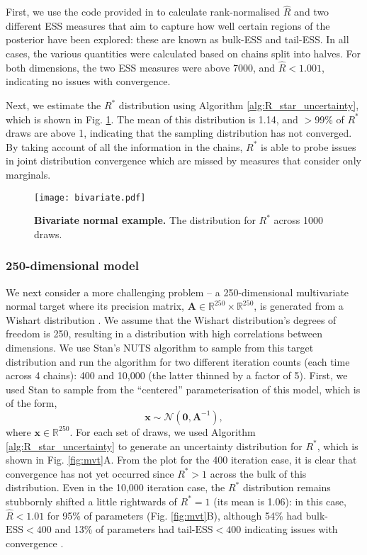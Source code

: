 \documentclass{article}
\begin{document}
First, we use the code provided in \cite{vehtari2019rank} to calculate rank-normalised $\widehat{R}$ and two different ESS measures that aim to capture how well certain regions of the posterior have been explored: these are known as bulk-ESS and tail-ESS. In all cases, the various quantities were calculated based on chains split into halves. For both dimensions, the two ESS measures were above 7000, and $\widehat{R}<1.001$, indicating no issues with convergence.

Next, we estimate the $R^*$ distribution using Algorithm \ref{alg:R_star_uncertainty}, which is shown in Fig. \ref{fig:bivariate}. The mean of this distribution is 1.14, and $>$99\% of $R^*$ draws are above 1, indicating that the sampling distribution has not converged. By taking account of all the information in the chains, $R^*$ is able to probe issues in joint distribution convergence which are missed by measures that consider only marginals.

\begin{figure}[!htb]
	\centerline{\texttt{[image: bivariate.pdf]}}
	\caption{\textbf{Bivariate normal example.} The distribution for $R^*$ across 1000 draws.}
	\label{fig:bivariate}
\end{figure}

\subsubsection{250-dimensional model}\label{sec:multivariate_normal_250}
We next consider a more challenging problem -- a 250-dimensional multivariate normal target where its precision matrix, $\boldsymbol{A}\in\mathbb{R}^{250}\times\mathbb{R}^{250}$, is generated from a Wishart distribution \citep{hoffman2014no}. We assume that the Wishart distribution's degrees of freedom is 250, resulting in a distribution with high correlations between dimensions. We use Stan's NUTS algorithm to sample from this target distribution and run the algorithm for two different iteration counts (each time across 4 chains): 400 and 10,000 (the latter thinned by a factor of 5). First, we used Stan to sample from the ``centered'' parameterisation of this model, which is of the form,
%
\begin{equation}\label{eq:mvt_normal_250}
\boldsymbol{x}\sim \mathcal{N}(\boldsymbol{0},\boldsymbol{A}^{-1}),
\end{equation}
%
where $\boldsymbol{x}\in\mathbb{R}^{250}$. For each set of draws, we used Algorithm \ref{alg:R_star_uncertainty} to generate an uncertainty distribution for $R^*$, which is shown in Fig. \ref{fig:mvt}A. From the plot for the 400 iteration case, it is clear that convergence has not yet occurred since $R^*>1$ across the bulk of this distribution. Even in the 10,000 iteration case, the $R^*$ distribution remains stubbornly shifted a little rightwards of $R^*=1$ (its mean is 1.06): in this case, $\widehat{R}<1.01$ for 95\% of parameters (Fig. \ref{fig:mvt}B), although 54\% had bulk-$\text{ESS}<400$ and 13\% of parameters had tail-$\text{ESS}<400$ indicating issues with convergence \citep{vehtari2019rank}.
\end{document}
